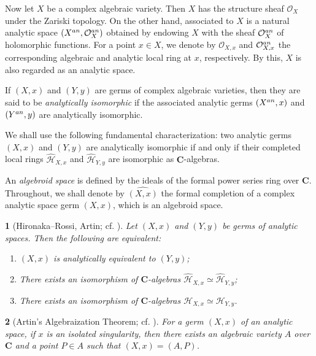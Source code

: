 \documentclass[10pt,a4paper]{amsart}
\numberwithin{equation}{section}
\numberwithin{figure}{section}
\newtheorem{thm}{\protect\theoremname}
\providecommand{\theoremname}{Theorem}
\numberwithin{equation}{section}
\newcommand{\C}{\mathbf{C}}
\begin{document}
Now let $X$ be a complex algebraic variety. Then $X$ has the structure sheaf $\mathcal{O}_X$ under the Zariski topology. On the other hand, associated to $X$ is a natural analytic space $(X^{\rm an},\mathcal{O}^{\rm an}_X)$ obtained by endowing $X$ with the sheaf $\mathcal{O}^{\rm an}_X$ of holomorphic functions. For a point $x \in X$, we denote by $\mathcal{O}_{X,x}$ and $\mathcal{O}^{\rm an}_{X,x}$ the corresponding algebraic and analytic local ring at $x$, respectively. By this, $X$ is also regarded as an analytic space.

If $(X,x)$ and $(Y,y)$ are germs of complex algebraic varieties, then they are said to be \emph{analytically isomorphic} if the associated analytic germs $(X^{\rm an},x)$ and $(Y^{\rm an},y)$ are analytically isomorphic.

We shall use the following fundamental characterization: two analytic germs $(X,x)$ and $(Y,y)$ are analytically isomorphic if and only if their completed local rings $\widehat{\mathcal{H}}_{X,x}$ and $\widehat{\mathcal{H}}_{Y,y}$ are isomorphic as $\C$-algebras.

An \emph{algebroid space} is defined by the ideals of the formal power series ring over $\C$. Throughout, we shall denote by $\widehat{(X,x)}$ the formal completion of a complex analytic space germ $(X,x)$, which is an algebroid space.

\begin{thm}[{Hironaka--Rossi, Artin; cf. \cite[Theorem 4.2.3]{Ish2014}}]\label{Thm: Artin's approximation}
Let $(X,x)$ and $(Y,y)$ be germs of analytic spaces. Then the following are equivalent:
\begin{enumerate}[\indent\rm(1)]
\item $(X,x)$ is analytically equivalent to $(Y,y)$;

\item There exists an isomorphism of $\C$-algebras $\widehat{\mathcal{H}}_{X,x}\simeq \widehat{\mathcal{H}}_{Y,y}$;

\item There exists an isomorphism of $\C$-algebras $\mathcal{H}_{X,x}\simeq \mathcal{H}_{Y,y}$.
\end{enumerate}
\end{thm}

\begin{thm}[{Artin's Algebraization Theorem; cf. \cite[Theorem 4.2.4]{Ish2014}}]\label{Thm: Artin's algebraization}
For a germ $(X,x)$ of an analytic space, if $x$ is an isolated singularity, then there exists an algebraic variety $A$ over $\C$ and a point $P \in A$ such that $(X,x)=(A,P)$.
\end{thm}
\end{document}
